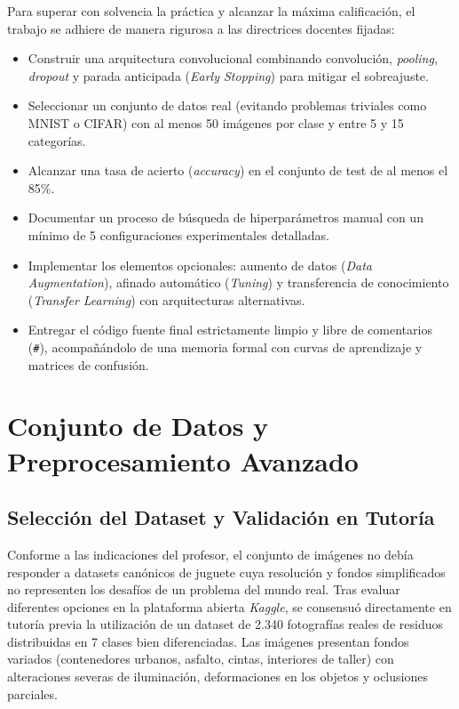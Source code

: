 \documentclass[11pt,a4paper]{article}
\begin{document}
Para superar con solvencia la práctica y alcanzar la máxima calificación, el trabajo se adhiere de manera rigurosa a las directrices docentes fijadas:
\begin{itemize}[noitemsep]
    \item Construir una arquitectura convolucional combinando convolución, \textit{pooling}, \textit{dropout} y parada anticipada (\textit{Early Stopping}) para mitigar el sobreajuste.
    \item Seleccionar un conjunto de datos real (evitando problemas triviales como MNIST o CIFAR) con al menos 50 imágenes por clase y entre 5 y 15 categorías.
    \item Alcanzar una tasa de acierto (\textit{accuracy}) en el conjunto de test de al menos el 85\%.
    \item Documentar un proceso de búsqueda de hiperparámetros manual con un mínimo de 5 configuraciones experimentales detalladas.
    \item Implementar los elementos opcionales: aumento de datos (\textit{Data Augmentation}), afinado automático (\textit{Tuning}) y transferencia de conocimiento (\textit{Transfer Learning}) con arquitecturas alternativas.
    \item Entregar el código fuente final estrictamente limpio y libre de comentarios (\texttt{\#}), acompañándolo de una memoria formal con curvas de aprendizaje y matrices de confusión.
\end{itemize}

\section{Conjunto de Datos y Preprocesamiento Avanzado}

\subsection{Selección del Dataset y Validación en Tutoría}
Conforme a las indicaciones del profesor, el conjunto de imágenes no debía responder a datasets canónicos de juguete cuya resolución y fondos simplificados no representen los desafíos de un problema del mundo real. Tras evaluar diferentes opciones en la plataforma abierta \textit{Kaggle}, se consensuó directamente en tutoría previa la utilización de un dataset de 2.340 fotografías reales de residuos distribuidas en 7 clases bien diferenciadas. Las imágenes presentan fondos variados (contenedores urbanos, asfalto, cintas, interiores de taller) con alteraciones severas de iluminación, deformaciones en los objetos y oclusiones parciales.
\end{document}

